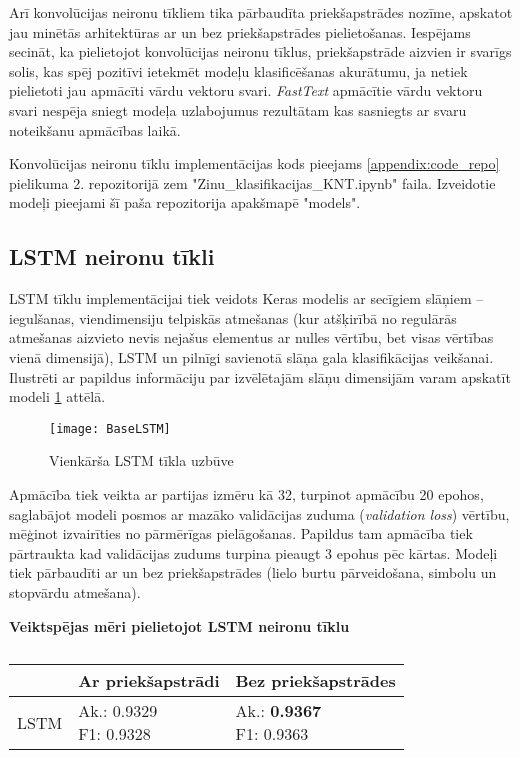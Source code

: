 Arī konvolūcijas neironu tīkliem tika pārbaudīta priekšapstrādes nozīme, apskatot jau minētās arhitektūras ar un bez priekšapstrādes pielietošanas. Iespējams secināt, ka pielietojot konvolūcijas neironu tīklus, priekšapstrāde aizvien ir svarīgs solis, kas spēj pozitīvi ietekmēt modeļu klasificēšanas akurātumu, ja netiek pielietoti jau apmācīti vārdu vektoru svari. \textit{FastText} apmācītie vārdu vektoru svari nespēja sniegt modeļa uzlabojumus rezultātam kas sasniegts ar svaru noteikšanu apmācības laikā.

Konvolūcijas neironu tīklu implementācijas kods pieejams \ref{appendix:code_repo} pielikuma 2. repozitorijā zem "Zinu\_klasifikacijas\_KNT.ipynb" faila. Izveidotie modeļi pieejami šī paša repozitorija apakšmapē "models".
\pagebreak

\subsection{LSTM neironu tīkli}
LSTM tīklu implementācijai tiek veidots Keras modelis ar secīgiem slāņiem – iegulšanas, viendimensiju telpiskās atmešanas (kur atšķirībā no regulārās atmešanas aizvieto nevis nejašus elementus ar nulles vērtību, bet visas vērtības vienā dimensijā), LSTM  un pilnīgi savienotā slāņa gala klasifikācijas veikšanai. Ilustrēti ar papildus informāciju par izvēlētajām slāņu dimensijām varam apskatīt modeli \ref{fig:BaseLSTM} attēlā.

\begin{figure}[H]
\centering
\texttt{[image: BaseLSTM]}
\caption{Vienkārša LSTM tīkla uzbūve}
\label{fig:BaseLSTM}
\end{figure}

Apmācība tiek veikta ar partijas izmēru kā 32, turpinot apmācību 20 epohos, saglabājot modeli posmos ar mazāko validācijas zuduma (\textit{validation loss}) vērtību, mēģinot izvairīties no pārmērīgas pielāgošanas. Papildus tam apmācība tiek pārtraukta kad validācijas zudums turpina pieaugt 3 epohus pēc kārtas. Modeļi tiek pārbaudīti ar un bez priekšapstrādes (lielo burtu pārveidošana, simbolu un stopvārdu atmešana). 

\begin{table}[H]
\centering
\caption{\label{tab:score_lstm}}
\textbf{Veiktspējas mēri pielietojot LSTM neironu tīklu\\}
\begin{tabular}{|l|l|l|}
\hline
& Ar priekšapstrādi & Bez priekšapstrādes \\ \hline
LSTM & \makecell{Ak.:  0.9329  \\ F1: 0.9328} & \makecell{Ak.: \textbf{0.9367}  \\ F1: 0.9363}\\ \hline
\end{tabular}
\end{table}

